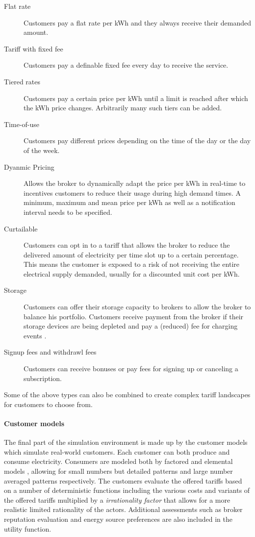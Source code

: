 \begin{description}
    \item[Flat rate] Customers pay a flat rate per kWh and they always receive their demanded
        amount.
    \item[Tariff with fixed fee] Customers pay a definable fixed fee every day to receive the service.
    \item [Tiered rates] Customers pay a certain price per kWh until a limit is reached after which the kWh price
        changes.  Arbitrarily many such tiers can be added.  \item[Time-of-use] Customers pay different prices depending
        on the time of the day or the day of the week.  \item[Dyanmic Pricing] Allows the broker to dynamically adapt
        the price per kWh in real-time to incentives customers to reduce their usage during high demand times. A
        minimum, maximum and mean price per kWh as well as a notification interval needs to be specified.
    \item[Curtailable] Customers can opt in to a tariff that allows the broker to reduce the delivered amount of
        electricity per time slot up to a certain percentage. This means the customer is exposed to a risk of not
        receiving the entire electrical supply demanded, usually for a discounted unit cost per kWh.  \item[Storage]
        Customers can offer their storage capacity to brokers to allow the broker to balance his portfolio. Customers
        receive payment from the broker if their storage devices are being depleted and pay a (reduced) fee for charging
        events \citep[p.9]{ketter2018powertac}.
    \item[Signup fees and withdrawl fees] Customers can receive bonuses or pay fees
        for signing up or canceling a subscription.
\end{description}

Some of the above types can also be combined to create complex tariff landscapes for customers to choose from.

\paragraph{Customer models}%

The final part of the simulation environment is made up by the customer models which simulate real-world customers.
Each customer can both produce and consume electricity. Consumers are modeled both by factored and elemental models
\citep[p.14]{ketter2018powertac}, allowing for small numbers but detailed patterns and large number averaged
patterns respectively. The customers evaluate the offered tariffs based on a number of deterministic functions
including the various costs and variants of the offered tariffs multiplied by a \emph{irrationality factor} that
allows for a more realistic limited rationality of the actors. Additional assessments such as broker reputation
evaluation and energy source preferences are also included in the utility function.

